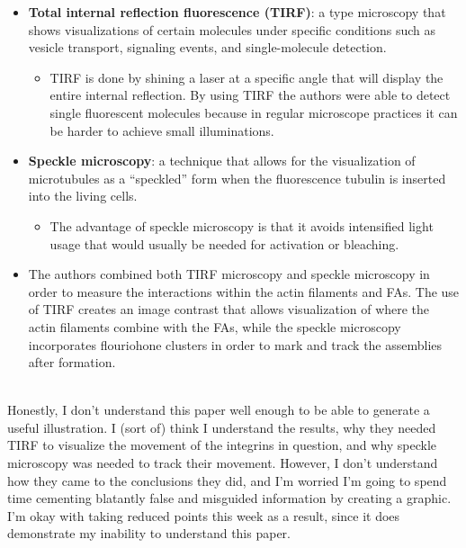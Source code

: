 \documentclass[basic,plain]{inVerba-notes}
\begin{document}
\begin{itemize}
  \item \textbf{Total internal reflection fluorescence (TIRF)}: a type microscopy that shows visualizations of certain molecules under specific conditions such as vesicle transport, signaling events, and single-molecule detection. 
    \begin{itemize}
      \item TIRF is done by shining a laser at a specific angle that will display the entire internal reflection. By using TIRF the authors were able to detect single fluorescent molecules because in regular microscope practices it can be harder to achieve small illuminations. 
    \end{itemize}

  \item \textbf{Speckle microscopy}: a technique that allows for the visualization of microtubules as a ``speckled'' form when the fluorescence tubulin is inserted into the living cells.
    \begin{itemize}
      \item The advantage of speckle microscopy is that it avoids intensified light usage that would usually be needed for activation or bleaching. 
    \end{itemize}
 
  \item The authors combined both TIRF microscopy and speckle microscopy in order to measure the interactions within the actin filaments and FAs. The use of TIRF creates an image contrast that allows visualization of where the actin filaments combine with the FAs, while the speckle microscopy incorporates flouriohone clusters in order to mark and track the assemblies after formation.
  
\end{itemize}

\\
Honestly, I don't understand this paper well enough to be able to generate a useful illustration. I (sort of) think I understand the results, why they needed TIRF to visualize the movement of the integrins in question, and why speckle microscopy was needed to track their movement. However, I don't understand how they came to the conclusions they did, and I'm worried I'm going to spend time cementing blatantly false and misguided information by creating a graphic. I'm okay with taking reduced points this week as a result, since it does demonstrate my inability to understand this paper.
\end{document}
